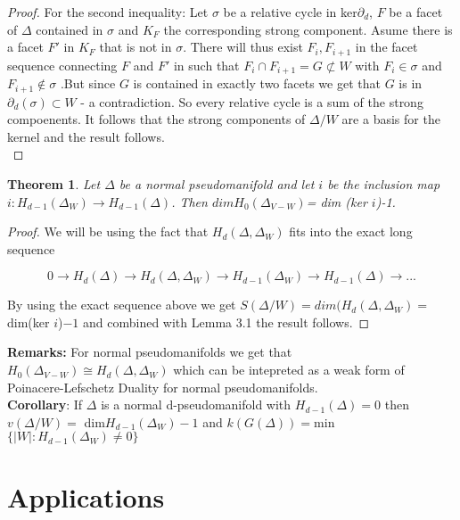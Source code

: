 \documentclass[a4paper]{article}
\newtheorem{theorem}{Theorem}[section]
\begin{document}
{\begin{proof}
For the second inequality: 
Let $\sigma$ be a relative cycle in ker$\partial _d$, $F$ be a facet of $\Delta$ contained in $\sigma$ and $K_F$ the corresponding strong component. Asume there is a facet $F'$ in $K_F$ that is not in $\sigma$. There will thus exist $F_i,F_{i+1}$ in the facet sequence connecting $F$ and $F'$ in such that $F_i\cap F_{i+1}=G \not \subset W$ with $F_i\in \sigma$ and $F_{i+1} \not \in \sigma$ .But since $G$ is contained in exactly two facets we get that $G$ is in $\partial _d(\sigma) \subset W$ - a contradiction. So every relative cycle is a sum of the strong compoenents. It follows that the strong components  of $\Delta/W$ are a basis for the kernel and the result follows. \\

\end{proof}


\begin{theorem}
Let $\Delta$ be a normal pseudomanifold and let $i$ be the inclusion map $i: H_{d-1}(\Delta_W)\rightarrow H_{d-1}(\Delta)$. Then  $dimH_0(\Delta_{V-W})$= dim (ker $i$)-1.
\end{theorem}

\begin{proof}

We will be using the fact that $H_d(\Delta,\Delta_W)$ fits into the exact long sequence

\begin{equation} 0 \longrightarrow H_d(\Delta) \longrightarrow H_d(\Delta,\Delta_W) \longrightarrow H_{d-1}(\Delta_W) \longrightarrow H_{d-1}(\Delta) \longrightarrow ... 
\end{equation}


By using the exact sequence above we get $S(\Delta/W) = dim(H_d(\Delta,\Delta_W)=$dim(ker $i$)$ - 1 $ and combined with Lemma 3.1 the result follows.
\end{proof}

\textbf{Remarks:}
For normal pseudomanifolds we get that $H_0(\Delta_{V-W})\cong H_d(\Delta,\Delta_W)$ which can be intepreted as a weak form of Poinacere-Lefschetz Duality for normal pseudomanifolds. \\

\textbf{Corollary}: If $\Delta$ is a normal d-pseudomanifold with $H_{d-1}(\Delta)=0$ then $v(\Delta/W) =$ dim$ H_{d-1}(\Delta_W)-1$ and $k(G(\Delta))=$min$\{|W|: H_{d-1}(\Delta_W)\neq 0\}$



\section{Applications}


}
\end{document}
